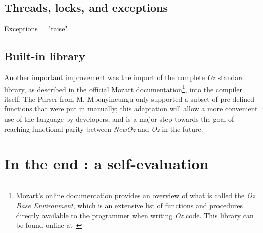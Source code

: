 \subsection{Threads, locks, and exceptions}
Exceptions = "raise"

\subsection{Built-in library}
Another important improvement was the import of the complete \textit{Oz} standard library, as described in the official Mozart documentation\footnote{Mozart's online documentation provides an overview of what is called the \textit{Oz Base Environment}, which is an extensive list of functions and procedures directly available to the programmer when writing \textit{Oz} code. This library can be found online at~\cite{mozart2doc}}, into the compiler itself.
The Parser from M. Mbonyincungu only supported a subset of pre-defined functions that were put in manually;
this adaptation will allow a more convenient use of the language by developers, and is a major step towards the goal of reaching functional parity between \textit{NewOz} and \textit{Oz} in the future.

\section{In the end : a self-evaluation}\label{sec:ch2-evaluation}